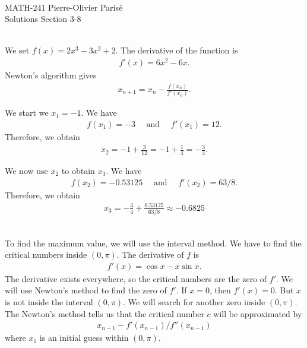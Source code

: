 


	\noindent \hrulefill \\
	MATH-241 \hfill Pierre-Olivier Paris{\'e}\\
	Solutions Section 3-8 \hfill \semester \\\vspace*{-1cm}
	
	\noindent\hrulefill
	
	\spc
	
	\\
	We set $f (x) = 2x^3 - 3x^2 + 2$. The derivative of the function is
		\begin{align*}
		f'(x) = 6x^2 - 6x .
		\end{align*}		
	Newton's algorithm gives
		\begin{align*}
		x_{n+1} = x_n - \frac{f (x_n)}{f'(x_n)} .
		\end{align*}			
		
	We start we $x_1 = -1$. We have
		\begin{align*}
		f(x_1 ) = -3 \quad \text{ and } \quad f'(x_1) =  12 .
		\end{align*}	
	Therefore, we obtain
		\begin{align*}
		x_2 = -1 + \frac{3}{12} = -1 + \frac{1}{4} = -\frac{3}{4} .
		\end{align*}
		
	We now use $x_2$ to obtain $x_3$. We have
		\begin{align*}
		f(x_2) = -0.53125 \quad \text{ and } \quad f'(x_2) =  63/8 .
		\end{align*}
	Therefore, we obtain
		\begin{align*}
		x_3 = -\frac{3}{4} + \frac{0.53125}{63/8} \approx -0.6825
		\end{align*}				

	\spc
	
	\\
	To find the maximum value, we will use the interval method. We have to find the critical numbers inside $(0, \pi )$. The derivative of $f$ is
		\begin{align*}
		f'(x) = \cos x - x \sin x .
		\end{align*}
	The derivative exists everywhere, so the critical numbers are the zero of $f'$. We will use Newton's method to find the zero of $f'$. If $x = 0$, then $f'(x) = 0$. But $x$ is not inside the interval $(0, \pi )$. We will search for another zero inside $(0, \pi )$. The Newton's method tells us that the critical number $c$ will be approximated by
		\begin{align*}
		x_{n-1} - f'(x_{n-1})/f''(x_{n-1})
		\end{align*}
	where $x_1$ is an initial guess within $(0, \pi )$. 
	
